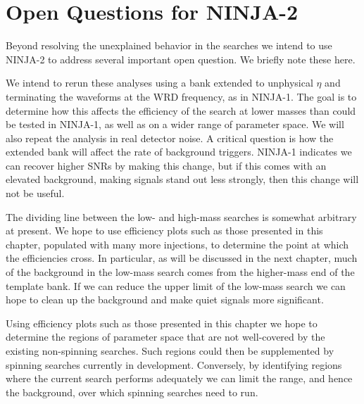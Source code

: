 \section{Open Questions for NINJA-2}

Beyond resolving the unexplained behavior in the searches we intend to
use NINJA-2 to address several important open question.  We briefly
note these here.


We intend to rerun these analyses using a bank extended to unphysical
$\eta$ and terminating the waveforms at the WRD frequency, as in
NINJA-1.  The goal is to determine how this affects the efficiency of
the search at lower masses than could be tested in NINJA-1, as well as
on a wider range of parameter space.  We will also repeat the analysis
in real detector noise.  A critical question is how the extended bank
will affect the rate of background triggers.  NINJA-1 indicates we can
recover higher SNRs by making this change, but if this comes with an
elevated background, making signals stand out less strongly, then this
change will not be useful.


The dividing line between the low- and high-mass searches is somewhat
arbitrary at present.  We hope to use efficiency plots such as those
presented in this chapter, populated with many more injections, to
determine the point at which the efficiencies cross.  In particular,
as will be discussed in the next chapter, much of the background in
the low-mass search comes from the higher-mass end of the template
bank.  If we can reduce the upper limit of the low-mass search we can
hope to clean up the background and make quiet signals more
significant.


Using efficiency plots such as those presented in this chapter we hope
to determine the regions of parameter space that are not well-covered
by the existing non-spinning searches.  Such regions could then be
supplemented by spinning searches currently in development.
Conversely, by identifying regions where the current search performs
adequately we can limit the range, and hence the background, over
which spinning searches need to run.


